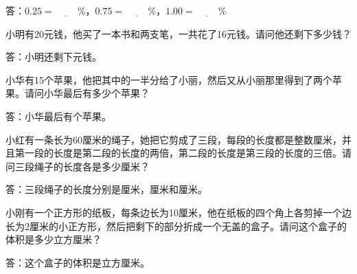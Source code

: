 \documentclass{ksexam}
\begin{document}
\begin{questions}
    答：$0.25 = \underline{\hspace{1cm}} \%$，$0.75 = \underline{\hspace{1cm}} \%$，$1.00 = \underline{\hspace{1cm}} \%$

    \question[14] 小明有20元钱，他买了一本书和两支笔，一共花了16元钱。请问他还剩下多少钱？

    答：小明还剩下\underline{\hspace{2cm}}元钱。

    \question[14] 小华有15个苹果，他把其中的一半分给了小丽，然后又从小丽那里得到了两个苹果。请问小华最后有多少个苹果？

    答：小华最后有\underline{\hspace{2cm}}个苹果。

    \question[14] 小红有一条长为60厘米的绳子，她把它剪成了三段，每段的长度都是整数厘米，并且第一段的长度是第二段的长度的两倍，第二段的长度是第三段的长度的三倍。请问三段绳子的长度各是多少厘米？

    答：三段绳子的长度分别是\underline{\hspace{2cm}}厘米，\underline{\hspace{2cm}}厘米和\underline{\hspace{2cm}}厘米。

    \question[14] 小刚有一个正方形的纸板，每条边长为10厘米，他在纸板的四个角上各剪掉一个边长为2厘米的小正方形，然后把剩下的部分折成一个无盖的盒子。请问这个盒子的体积是多少立方厘米？

    答：这个盒子的体积是\underline{\hspace{2cm}}立方厘米。

\end{questions}
\end{document}
